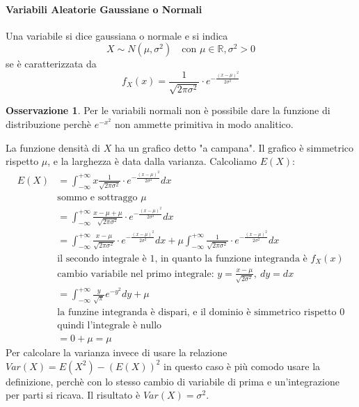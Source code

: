 \documentclass{article}
\theoremstyle{plain}
\theoremstyle{definition}
\newtheorem{osservazione}{Osservazione}[section]
\theoremstyle{remark}
\begin{document}
\paragraph{Variabili Aleatorie Gaussiane o Normali} %
\label{par:variabili_aleatorie_gaussiane_o_normali}
Una variabile si dice gaussiana o normale e si indica
\begin{equation*}
	X\sim N(\mu, \sigma^2)\quad\text{con }\mu\in\mathds{R},\sigma^2>0
\end{equation*}
se è caratterizzata da
\begin{equation*}
	f_X(x)=\frac{1}{\sqrt{2\pi\sigma^2}}\cdot e^{-\frac{(x-\mu)^2}{2\sigma^2}}
\end{equation*}
\begin{osservazione}
	Per le variabili normali non è possibile dare la funzione di distribuzione perchè $e^{-x^2}$ non ammette primitiva in modo analitico.
\end{osservazione}
La funzione densità di $X$ ha un grafico detto "a campana". Il grafico è simmetrico rispetto $\mu$, e la larghezza è data dalla varianza. Calcoliamo $E(X)$:
\begin{align*}
	E(X)&=\int_{-\infty}^{+\infty}x\frac{1}{\sqrt{2\pi\sigma^2}}\cdot e^{-\frac{(x-\mu)^2}{2\sigma^2}}dx\\
	&\text{sommo e sottraggo }\mu\\
	&=\int_{-\infty}^{+\infty}\frac{x-\mu+\mu}{\sqrt{2\pi\sigma^2}}\cdot e^{-\frac{(x-\mu)^2}{2\sigma^2}}dx\\
	&=\int_{-\infty}^{+\infty}\frac{x-\mu}{\sqrt{2\pi\sigma^2}}\cdot e^{-\frac{(x-\mu)^2}{2\sigma^2}}dx+\mu\int_{-\infty}^{+\infty}\frac{1}{\sqrt{2\pi\sigma^2}}\cdot e^{-\frac{(x-\mu)^2}{2\sigma^2}}dx\\
	&\text{il secondo integrale è }1\text{, in quanto la funzione integranda è }f_X(x)\\
	&\text{cambio variabile nel primo integrale: }y=\frac{x-\mu}{\sqrt{2\sigma^2}},\ dy=dx\\
	&=\int_{-\infty}^{+\infty}\frac{y}{\sqrt{\pi}}e^{-y^2}dy+\mu\\
	&\text{la funzine integranda è dispari, e il dominio è simmetrico rispetto }0\\
	&\text{quindi l'integrale è nullo}\\
	&=0+\mu=\mu
\end{align*}
Per calcolare la varianza invece di usare la relazione $Var(X)=E(X^2)-(E(X))^2$ in questo caso è più comodo usare la definizione, perchè con lo stesso cambio di variabile di prima e un'integrazione per parti si ricava. Il risultato è $Var(X)=\sigma^2$.
\end{document}
